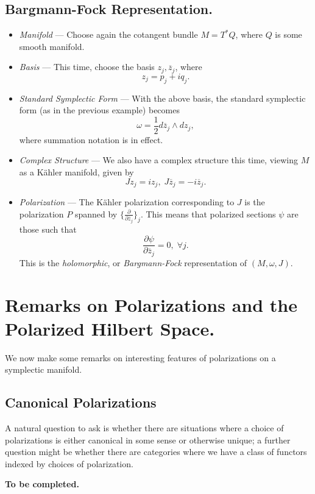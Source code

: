 \documentclass{tufte-handout}
\begin{document}
\subsection{Bargmann-Fock Representation.}
\begin{itemize}
\item \emph{Manifold} --- Choose again the cotangent bundle $M = T^*Q$, where $Q$ is some smooth manifold.
\item \emph{Basis} --- This time, choose the basis $z_j, \overline{z}_j$, where
$$
z_j = p_j + iq_j.
$$
\item \emph{Standard Symplectic Form} --- With the above basis, the standard symplectic form (as in the previous example) becomes
$$
\omega = \frac{1}{2}d\overline{z}_j \wedge dz_j,
$$
where summation notation is in effect.
\item \emph{Complex Structure} --- We also have a complex structure this time, viewing $M$ as a K\"{a}hler manifold, given by
$$
J z_j = i z_j, \; J \overline{z}_j = -i \overline{z}_j.
$$
\item \emph{Polarization} --- The K\"{a}hler polarization corresponding to $J$ is the polarization $P$ spanned by $\{\frac{\partial}{\partial \overline{z}_j}\}_j$. This means that polarized sections $\psi$ are those such that
$$
\frac{\partial \psi}{\partial \overline{z}_j} = 0, \; \forall j.
$$
This is the \emph{holomorphic}, or \emph{Bargmann-Fock} representation of $(M,\omega,J)$.
\end{itemize}


\section{Remarks on Polarizations and the Polarized Hilbert Space.}
We now make some remarks on interesting features of polarizations on a symplectic manifold.

\subsection{Canonical Polarizations}
A natural question to ask is whether there are situations where a choice of polarizations is either canonical in some sense or otherwise unique; a further question might be whether there are categories where we have a class of functors indexed by choices of polarization.

\textbf{To be completed.}
\end{document}
